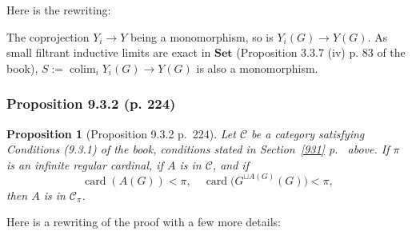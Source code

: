 \documentclass[12pt]{article}
\newtheorem{prop}[thm]{Proposition}
\theoremstyle{remark}
\theoremstyle{definition}
\newcommand{\C}{\mathcal C}
\newcommand{\Set}{\mathbf{Set}}
\DeclareMathOperator*{\colim}{colim}
\DeclareMathOperator{\card}{card}
\begin{document}
Here is the rewriting: 

The coprojection $Y_i\to Y$ being a monomorphism, so is $Y_i(G)\to Y(G)$. As small filtrant inductive limits are exact in $\Set$ (Proposition 3.3.7 (iv) p. 83 of the book), $S:=\colim_iY_i(G)\to Y(G)$ is also a monomorphism.

%

\subsubsection{Proposition 9.3.2 (p. 224)}

\begin{prop}[Proposition 9.3.2 p.~224]\label{932} 
Let $\C$ be a category satisfying Conditions (9.3.1) of the book, conditions stated in Section~\ref{931} p.~\pageref{931} above. If $\pi$ is an infinite regular cardinal, if $A$ is in $\C$, and if 
$$
\card(A(G))<\pi,\quad\card\big(G^{\sqcup A(G)}(G)\big)<\pi,
$$ 
then $A$ is in $\C_\pi$.
\end{prop}

Here is a rewriting of the proof with a few more details:
\end{document}
